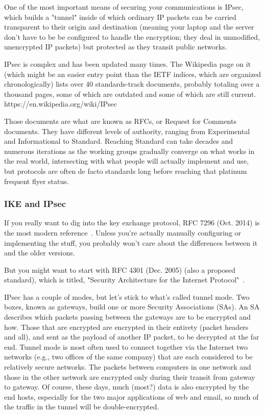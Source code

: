\documentclass[%
 aip,
 jmp,%
 amsmath,amssymb,
 reprint,%
]{revtex4-1}
\begin{document}
One of the most important means of securing your communications is
IPsec, which builds a "tunnel" inside of which ordinary IP packets can
be carried transparent to their origin and destination (meaning your
laptop and the server don't have to be be configured to handle the
encryption; they deal in unmodified, unencrypted IP packets) but
protected as they transit public networks.

IPsec is complex and has been updated many times.  The Wikipedia page
on it (which might be an easier entry point than the IETF indices,
which are organized chronologically) lists over 40 standards-track
documents, probably totaling over a thousand pages, some of which are
outdated and some of which are still current.
https://en.wikipedia.org/wiki/IPsec

Those documents are what are known as RFCs, or Request for Comments
documents.  They have different levels of authority, ranging from
Experimental and Informational to Standard.  Reaching Standard can
take decades and numerous iterations as the working groups gradually
converge on what works in the real world, intersecting with what
people will actually implement and use, but protocols are often de
facto standards long before reaching that platinum frequent flyer
status.

\subsubsection{IKE and IPsec}

If you really want to dig into the key exchange protocol, RFC 7296
(Oct. 2014) is the most modern reference~\cite{RFC7296}.  Unless
you're actually manually configuring or implementing the stuff, you
probably won't care about the differences between it and the older
versions.

But you might want to start with RFC 4301 (Dec. 2005) (also a proposed
standard), which is titled, "Security Architecture for the Internet
Protocol"~\cite{RFC4301}.

IPsec has a couple of modes, but let's stick to what's called tunnel
mode.  Two boxes, known as gateways, build one or more Security
Associations (SAs). An SA describes which packets passing between the
gateways are to be encrypted and how.  Those that are encrypted are
encrypted in their entirety (packet headers and all), and sent as the
payload of another IP packet, to be decrypted at the far end.  Tunnel
mode is most often used to connect together via the Internet two
networks (e.g., two offices of the same company) that are each
considered to be relatively secure networks.  The packets between
computers in one network and those in the other network are encrypted
only during their transit from gateway to gateway.  Of course, these
days, much (most?) data is also encrypted by the end hosts, especially
for the two major applications of web and email, so much of the
traffic in the tunnel will be double-encrypted.
\end{document}
